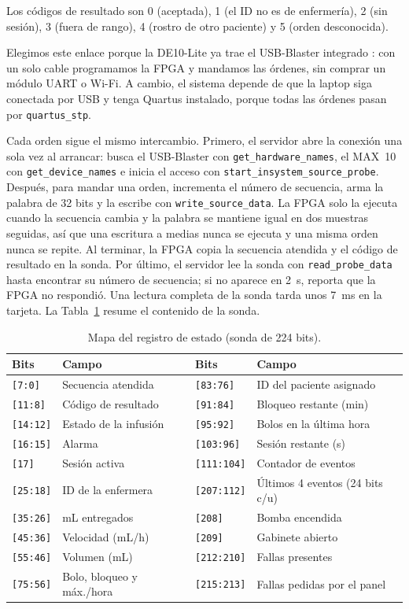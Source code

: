 \documentclass[11pt,letterpaper]{article}
\newcommand{\code}[1]{\texttt{#1}}
\begin{document}
Los códigos de resultado son 0 (aceptada), 1 (el ID no es de enfermería), 2 (sin sesión), 3 (fuera de rango), 4 (rostro de otro paciente) y 5 (orden desconocida).

Elegimos este enlace porque la DE10-Lite ya trae el USB-Blaster integrado \cite{de10lite}: con un solo cable programamos la FPGA y mandamos las órdenes, sin comprar un módulo UART o Wi-Fi. A cambio, el sistema depende de que la laptop siga conectada por USB y tenga Quartus instalado, porque todas las órdenes pasan por \code{quartus\_stp}.

Cada orden sigue el mismo intercambio. Primero, el servidor abre la conexión una sola vez al arrancar: busca el USB-Blaster con \code{get\_hardware\_names}, el MAX~10 con \code{get\_device\_names} e inicia el acceso con \code{start\_insystem\_source\_probe}. Después, para mandar una orden, incrementa el número de secuencia, arma la palabra de 32 bits y la escribe con \code{write\_source\_data}. La FPGA solo la ejecuta cuando la secuencia cambia y la palabra se mantiene igual en dos muestras seguidas, así que una escritura a medias nunca se ejecuta y una misma orden nunca se repite. Al terminar, la FPGA copia la secuencia atendida y el código de resultado en la sonda. Por último, el servidor lee la sonda con \code{read\_probe\_data} hasta encontrar su número de secuencia; si no aparece en 2~s, reporta que la FPGA no respondió. Una lectura completa de la sonda tarda unos 7~ms en la tarjeta. La Tabla~\ref{tab:sonda} resume el contenido de la sonda.

\begin{table}[H]
\centering
\caption{Mapa del registro de estado (sonda de 224 bits).}
\label{tab:sonda}
\begin{tabular}{ll|ll}
\toprule
\textbf{Bits} & \textbf{Campo} & \textbf{Bits} & \textbf{Campo} \\
\midrule
\code{[7:0]} & Secuencia atendida & \code{[83:76]} & ID del paciente asignado \\
\code{[11:8]} & Código de resultado & \code{[91:84]} & Bloqueo restante (min) \\
\code{[14:12]} & Estado de la infusión & \code{[95:92]} & Bolos en la última hora \\
\code{[16:15]} & Alarma & \code{[103:96]} & Sesión restante (s) \\
\code{[17]} & Sesión activa & \code{[111:104]} & Contador de eventos \\
\code{[25:18]} & ID de la enfermera & \code{[207:112]} & Últimos 4 eventos (24 bits c/u) \\
\code{[35:26]} & mL entregados & \code{[208]} & Bomba encendida \\
\code{[45:36]} & Velocidad (mL/h) & \code{[209]} & Gabinete abierto \\
\code{[55:46]} & Volumen (mL) & \code{[212:210]} & Fallas presentes \\
\code{[75:56]} & Bolo, bloqueo y máx./hora & \code{[215:213]} & Fallas pedidas por el panel \\
\bottomrule
\end{tabular}
\end{table}
\end{document}
